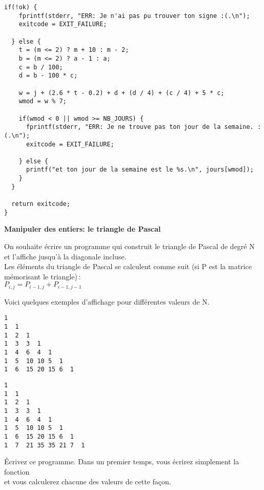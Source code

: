 \documentclass[10pt]{article}\usepackage[enonce]{exemptty}
\begin{document}
\begin{Reponse}
\begin{minipage}{\linewidth}
\begin{Verbatim}[label=Reponse aux 3 questions de l'exercice 2 proposee par Julien]
  if(!ok) {
    fprintf(stderr, "ERR: Je n'ai pas pu trouver ton signe :(.\n");
    exitcode = EXIT_FAILURE;

  } else {
    t = (m <= 2) ? m + 10 : m - 2;
    b = (m <= 2) ? a - 1 : a;
    c = b / 100;
    d = b - 100 * c;

    w = j + (2.6 * t - 0.2) + d + (d / 4) + (c / 4) + 5 * c;
    wmod = w % 7;

    if(wmod < 0 || wmod >= NB_JOURS) {
      fprintf(stderr, "ERR: Je ne trouve pas ton jour de la semaine. :(.\n");
      exitcode = EXIT_FAILURE;

    } else {
      printf("et ton jour de la semaine est le %s.\n", jours[wmod]);
    }
  }

  return exitcode;
}
  \end{Verbatim}
\end{minipage}\hfill


\end{Reponse}


\bigskip\Exercice\textbf{Manipuler des entiers: le triangle de Pascal}

On souhaite écrire un programme qui construit le triangle de Pascal de
degré N et l'affiche jusqu'à la diagonale incluse. \\

Les éléments du triangle de Pascal se calculent comme suit (si P est
la matrice mémorisant le triangle)\,: \\
$P_{i,j} = P_{i-1,j} + P_{i-1,j-1}$

Voici quelques exemples d'affichage pour différentes valeurs de N.

\bigskip\noindent\begin{minipage}{.45\linewidth}
  \begin{Verbatim}[label=Affichage quand N vaut 6]
1 
1  1
1  2  1
1  3  3  1
1  4  6  4  1
1  5  10 10 5  1
1  6  15 20 15 6  1    
  \end{Verbatim}
\end{minipage}\hfill
\begin{minipage}{.45\linewidth}
  \begin{Verbatim}[label=Affichage quand N vaut 7]
1 
1  1
1  2  1
1  3  3  1
1  4  6  4  1
1  5  10 10 5  1
1  6  15 20 15 6  1    
1  7  21 35 35 21 7  1
  \end{Verbatim}
\end{minipage}

\Question Écrivez ce programme. Dans un premier temps, vous écrirez simplement
la fonction \\ et vous calculerez
chacune des valeurs de cette façon.
\end{document}
